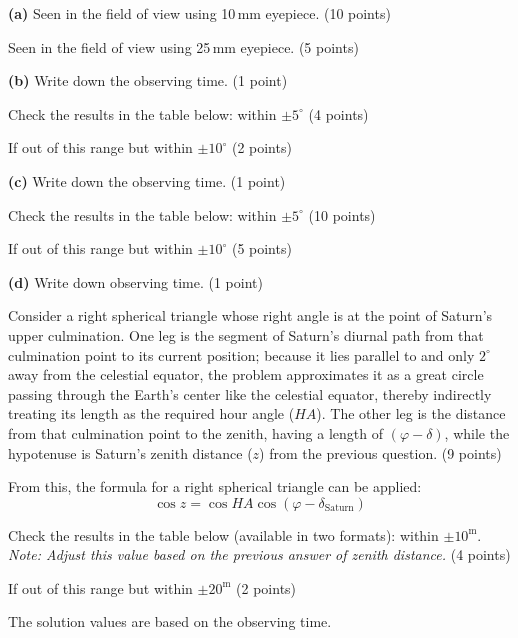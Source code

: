 \textbf{(a)} Seen in the field of view using 10\,mm eyepiece. \hfill(10 points)

Seen in the field of view using 25\,mm eyepiece. \hfill(5 points)

\textbf{(b)} Write down the observing time. \hfill(1 point)

Check the results in the table below: within $\pm 5^\circ$ \hfill(4 points)

If out of this range but within $\pm 10^\circ$ \hfill(2 points)

\textbf{(c)} Write down the observing time. \hfill(1 point)

Check the results in the table below: within $\pm 5^\circ$ \hfill(10 points)

If out of this range but within $\pm 10^\circ$ \hfill(5 points)

\textbf{(d)} Write down observing time. \hfill(1 point)

Consider a right spherical triangle whose right angle is at the point of
Saturn's upper culmination. One leg is the segment of Saturn's diurnal path
from that culmination point to its current position; because it lies parallel
to and only $2^\circ$ away from the celestial equator, the problem
approximates it as a great circle passing through the Earth's center like the
celestial equator, thereby indirectly treating its length as the required hour
angle ($HA$). The other leg is the distance from that culmination point to the
zenith, having a length of $(\varphi - \delta)$, while the hypotenuse is
Saturn's zenith distance ($z$) from the previous question. \hfill(9 points)

From this, the formula for a right spherical triangle can be applied:
\[ \cos z = \cos HA \cos(\varphi - \delta_{\mathrm{Saturn}}) \]

Check the results in the table below (available in two formats): within
$\pm 10^{\mathrm{m}}$. \textit{Note: Adjust this value based on the previous
answer of zenith distance.} \hfill(4 points)

If out of this range but within $\pm 20^{\mathrm{m}}$ \hfill(2 points)

The solution values are based on the observing time.

